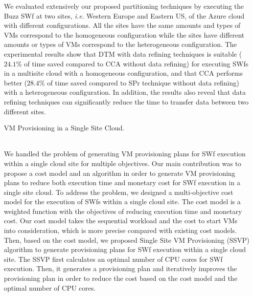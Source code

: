 We evaluated extensively our proposed partitioning techniques by executing the Buzz SWf at two sites, \textit{i.e.} Western Europe and Eastern US, of the Azure cloud with different configurations. All the sites have the same amounts and types of VMs correspond to the homogeneous configuration while the sites have different amounts or types of VMs correspond to the heterogeneous configuration. 
The experimental results show that DTM with data refining techniques is suitable ($24.1$\% of time saved compared to CCA without data refining) for executing SWfs in a multisite cloud with a homogeneous configuration, and that CCA performs better ($28.4$\% of time saved compared to SPr technique without data refining) with a heterogeneous configuration. In addition, the results also reveal that data refining techniques can significantly reduce the time to transfer data between two different sites. 
\\[12pt]
\noindent \begin{bf}VM Provisioning in a Single Site Cloud.\end{bf} 
\\[6pt]
\noindent We handled the problem of generating VM provisioning plans for SWf execution within a single cloud site for multiple objectives. Our main contribution was to propose a cost model and an algorithm in order to generate VM provisioning plans to reduce both execution time and monetary cost for SWf execution in a single site cloud.
To address the problem, we designed a multi-objective cost model for the execution of SWfs within a single cloud site. The cost model is a weighted function with the objectives of reducing execution time and monetary cost. Our cost model takes the sequential workload and the cost to start VMs into consideration, which is more precise compared with existing cost models. Then, based on the cost model, we proposed Single Site VM Provisioning (SSVP) algorithm to generate provisioning plans for SWf execution within a single cloud site. The SSVP first calculates an optimal number of CPU cores for SWf execution. Then, it generates a provisioning plan and iteratively improves the provisioning plan in order to reduce the cost based on the cost model and the optimal number of CPU cores. 

